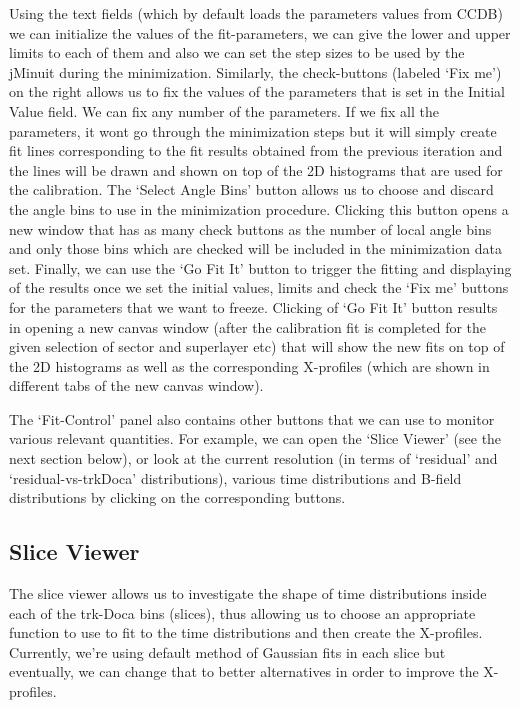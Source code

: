 \documentclass[12pt]{article}
\begin{document}
Using the text fields (which by default loads the parameters values from CCDB) we can initialize the values of the fit-parameters, we can give the lower and upper limits to each of them and also we can set the step sizes to be used by the jMinuit during the minimization. Similarly, the check-buttons (labeled `Fix me') on the right allows us to fix the values of the parameters that is set in the Initial Value field. We can fix any number of the parameters. If we fix all the parameters, it wont go through the minimization steps but it will simply create fit lines corresponding to the fit results obtained from the previous iteration and the lines will be drawn and shown on top of the 2D histograms that are used for the calibration. The `Select Angle Bins' button allows us to choose and discard the angle bins to use in the minimization procedure. Clicking this button opens a new window that has as many check buttons as the number of local angle bins and only those bins which are checked will be included in the minimization data set. Finally, we can use the `Go Fit It' button to trigger the fitting and displaying of the results once we set the initial values, limits and check the `Fix me' buttons for the parameters that we want to freeze. Clicking of `Go Fit It' button results in opening a new canvas window (after the calibration fit is completed for the given selection of sector and superlayer etc) that will show the new fits on top of the 2D histograms as well as the corresponding X-profiles (which are shown in different tabs of the new canvas window).


The `Fit-Control' panel also contains other buttons that we can use to monitor various relevant quantities. For example, we can open the `Slice Viewer' (see the next section below), or look at the current resolution (in terms of `residual' and `residual-vs-trkDoca' distributions), various time distributions and B-field distributions by clicking on the corresponding buttons.


\subsection{Slice Viewer}

The slice viewer allows us to investigate the shape of time distributions inside each of the trk-Doca bins (slices), thus allowing us to choose an appropriate function to use to fit to the time distributions and then create the X-profiles. Currently, we're using default method of Gaussian fits in each slice but eventually, we can change that to better alternatives in order to improve the X-profiles.
\end{document}
